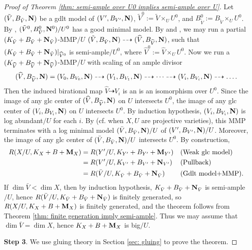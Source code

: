 \documentclass[11pt]{amsart}
\numberwithin{equation}{section}
\newcommand{\Mm}{{\bf{M}}}
\newcommand{\NN}{{\bf{N}}}
\theoremstyle{definition}
\theoremstyle{definition}
\theoremstyle{definition}
\begin{document}
\begin{proof}[Proof of Theorem \ref{thm: semi-ample over U0 implies semi-ample over U}]
Let $(\tilde{V},B_{\tilde{V}},\NN)$ be a gdlt model of $(V',B_{V'},\NN)$, $\tilde{V}^0:=\tilde{V}\times_UU^0$, and $B^0_{\tilde V}:=B_{\tilde V}\times_UU^0$. By \cite[Theorem 3.14]{HL21a}, $(\tilde V^0,B^0_{\tilde V},\NN^0)/U^0$ has a good minimal model. By \cite[Lemma 2.7]{LX22} and \cite[Lemmas 3.9]{HL21a}, we may run a partial $(K_{\tilde V}+B_{\tilde V}+\NN_{\tilde V})$-MMP$/U$ $(\tilde V,B_{\tilde V},\NN)\dashrightarrow (\widehat V,B_{\widehat V},\NN)$, such that $(K_{\tilde V}+B_{\tilde V}+\NN_{\tilde V})|_{\widehat V^0}$ is semi-ample$/U^0$, where $\widehat V^0:=\widehat V\times_UU^0$. Now we run a $(K_{\widehat V}+B_{\widehat V}+\NN_{\widehat V})$-MMP$/U$ with scaling of an ample divisor
$$(\widehat V,B_{\widehat V},\NN)=(V_0,B_{V_0},\NN)\dashrightarrow (V_1,B_{V_1},\NN)\dashrightarrow\dots\dashrightarrow (V_i,B_{V_i},\NN)\dashrightarrow\dots.$$ 
Then the induced birational map $\widehat V\dashrightarrow V_i$ is an is an isomorphism over $U^0$. Since the image of any glc center of $(\widehat V,B_{\widehat V},\NN)$ on $U$ intersects $U^0$, the image of any glc center of $(V_i,B_{V_i},\NN)$ on $U$ intersects $U^0$. By induction hypothesis, $(V_i,B_{V_i},\NN)$ is log abundant$/U$ for each $i$. By \cite[Theorem 7.6]{LX22} (cf. \cite[Theorem 3.15]{Has22} when $X,U$ are projective varieties), this MMP terminates with a log minimal model $(\bar V,B_{\bar V},\NN)/U$ of $(V',B_{V'},\NN)/U$. Moreover, the image of any glc center of  $(\bar V,B_{\bar V},\NN)/U$ intersects $U^0$. By construction, 
\begin{align*}
    R(X/U,K_X+B+\Mm_X)&=R(Y'/U,K_{Y'}+B_{Y'}+\Mm_{Y'}) && \text{(Weak glc model)}\\
                    &=R(V'/U,K_{V'}+B_{V'}+\NN_{V'}) && \text{(Pullback)}\\
                  &=R(\bar{V}/U,K_{\bar{V}}+B_{\bar{V}}+\NN_{\bar{V}}) && (\text{Gdlt model+MMP}).
\end{align*}
If $\dim \bar V<\dim X$, then by induction hypothesis,  $K_{\bar{V}}+B_{\bar{V}}+\NN_{\bar{V}}$ is semi-ample$/U$, hence $R(\bar{V}/U,K_{\bar{V}}+B_{\bar{V}}+\NN_{\bar{V}})$ is finitely generated, so $R(X/U,K_X+B+\Mm_X)$ is finitely generated, and the theorem follows from Theorem \ref{thm: finite generation imply semi-ample}. Thus we may assume that $\dim \bar V=\dim X$, hence $K_X+B+\Mm_X$ is big$/U$.

\medskip

\noindent\textbf{Step 3}. We use gluing theory in Section \ref{sec: gluing} to prove the theorem. 


\end{proof}
\end{document}
